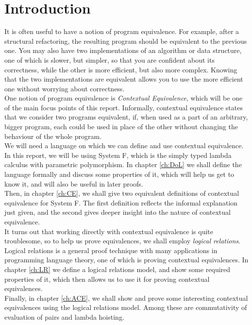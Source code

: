 \documentclass[a4paper, 11pt]{report}
\theoremstyle{definition}
\begin{document}
\tableofcontents
\cleardoublepage
{}
\setcounter{secnumdepth}{2}


\chapter{Introduction}
\label{ch:intro}

It is often useful to have a notion of program equivalence. For example, after a structural refactoring, the resulting program should be equivalent to the previous one. You may also have two implementations of an algorithm or data structure, one of which is slower, but simpler, so that you are confident about its correctness, while the other is more efficient, but also more complex. Knowing that the two implementations are equivalent allows you to use the more efficient one without worrying about correctness.\\
One notion of program equivalence is \textit{Contextual Equivalence}, which will be one of the main focus points of this report. Informally, contextual equivalence states that we consider two programs equivalent, if, when used as a part of an arbitrary, bigger program, each could be used in place of the other without changing the behaviour of the whole program.\\
We will need a language on which we can define and use contextual equivalence.
In this report, we will be using System F, which is the simply typed lambda calculus with parametric polymorphism. In chapter \ref{ch:DoL} we shall define the language formally and discuss some properties of it, which will help us get to know it, and will also be useful in later proofs.\\
Then, in chapter \ref{ch:CE}, we shall give two equivalent definitions of contextual equivalence for System F. The first definition reflects the informal explanation just given, and the second gives deeper insight into the nature of contextual equivalence.\\
It turns out that working directly with contextual equivalence is quite troublesome, so to help us prove equivalences, we shall employ \textit{logical relations}. Logical relations is a general proof technique with many applications in programming language theory, one of which is proving contextual equivalences. In chapter \ref{ch:LR} we define a logical relations model, and show some required properties of it, which then allows us to use it for proving contextual equivalences.\\
Finally, in chapter \ref{ch:ACE}, we shall show and prove some interesting contextual equivalences using the logical relations model. Among these are commutativity of evaluation of pairs and lambda hoisting.
\end{document}
